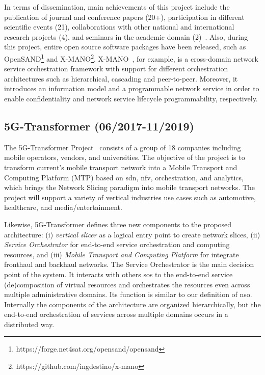 In terms of dissemination, main achievements of this project include the publication of journal and conference papers (20+), participation in different scientific events (21), collaborations with other national and international research projects (4), and seminars in the academic domain (2)~\cite{vitalD65}. Also, during this project, entire open source software packages have been released, such as OpenSAND\footnote{https://forge.net4sat.org/opensand/opensand} and X-MANO\footnote{https://github.com/ingdestino/x-mano}. X-MANO~\cite{francescon2017x}, for example, is a cross-domain network service orchestration framework with support for different orchestration architectures such as hierarchical, cascading and peer-to-peer. Moreover, it introduces an information model and a programmable network service in order to enable confidentiality and network service lifecycle programmability, respectively.

\subsection{5G-Transformer (06/2017-11/2019)}
The 5G-Transformer Project~\cite{5g-TransformerProject20175GVerticals} consists of a group of 18 companies including mobile operators, vendors, and universities. The objective of the project is to transform current’s mobile transport network into a Mobile Transport and Computing Platform (MTP) based on \gls{sdn}, \gls{nfv}, orchestration, and analytics, which brings the Network Slicing paradigm into mobile transport networks. The project will support a variety of vertical industries use cases such as automotive, healthcare, and media/entertainment. 

Likewise, 5G-Transformer defines three new components to the proposed architecture: (i) \textit{vertical slicer} as a logical entry point to create network slices, (ii) \textit{Service Orchestrator} for end-to-end service orchestration and computing resources, and (iii) \textit{Mobile Transport and Computing Platform} for integrate fronthaul and backhaul networks. The Service Orchestrator is the main decision point of the system. It interacts with others \glspl{so} to the end-to-end service (de)composition of virtual resources and orchestrates the resources even across multiple administrative domains. Its function is similar to our definition of \gls{nso}. Internally the components of the architecture are organized hierarchically, but the end-to-end orchestration of services across multiple domains occurs in a distributed way.

